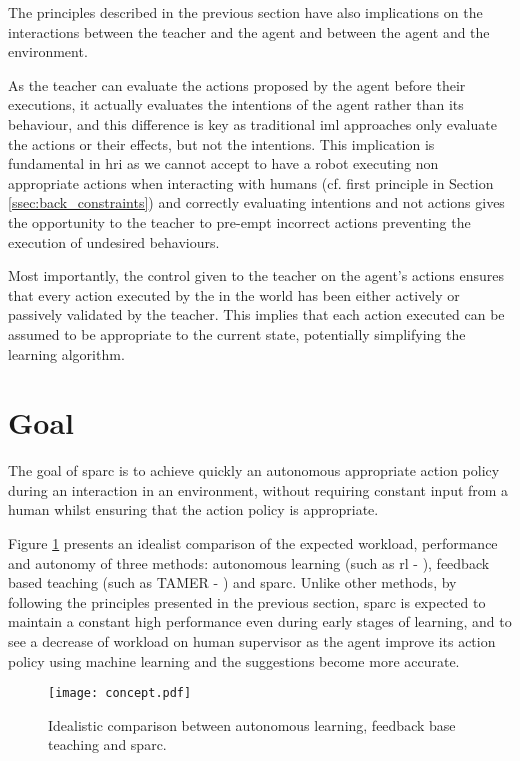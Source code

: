 The principles described in the previous section have also implications on the interactions between the teacher and the agent and between the agent and the environment.

As the teacher can evaluate the actions proposed by the agent before their executions, it actually evaluates the intentions of the agent rather than its behaviour, and this difference is key as traditional \gls{iml} approaches only evaluate the actions or their effects, but not the intentions. This implication is fundamental in \gls{hri} as we cannot accept to have a robot executing non appropriate actions when interacting with humans (cf. first principle in Section \ref{ssec:back_constraints}) and correctly evaluating intentions and not actions gives the opportunity to the teacher to pre-empt incorrect actions preventing the execution of undesired behaviours.

Most importantly, the control given to the teacher on the agent's actions ensures that every action executed by the in the world has been either actively or passively validated by the teacher. This implies that each action executed can be assumed to be appropriate to the current state, potentially simplifying the learning algorithm.

\section{Goal}

The goal of \gls{sparc} is to achieve quickly an autonomous appropriate action policy during an interaction in an environment, without requiring constant input from a human whilst ensuring that the action policy is appropriate. 

Figure \ref{fig:concept} presents an idealist comparison of the expected workload, performance and autonomy of three methods: autonomous learning (such as \gls{rl} - \citealt{sutton1998reinforcement}), feedback based teaching (such as TAMER - \citealt{knox2009interactively}) and \gls{sparc}. Unlike other methods, by following the principles presented in the previous section, \gls{sparc} is expected to maintain a constant high performance even during early stages of learning, and to see a decrease of workload on human supervisor as the agent improve its action policy using machine learning and the suggestions become more accurate.

\begin{figure}[ht]
	\texttt{[image: concept.pdf]}
	\centering
	\caption{Idealistic comparison between autonomous learning, feedback base teaching and \gls{sparc}.}
	\label{fig:concept}
\end{figure}

